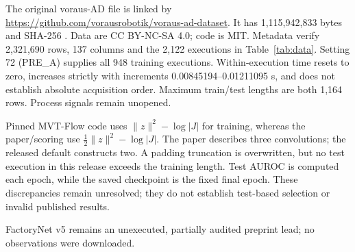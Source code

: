 The original voraus-AD file is linked by \url{https://github.com/vorausrobotik/voraus-ad-dataset}. It has 1,115,942,833 bytes and SHA-256 . Data are CC BY-NC-SA 4.0; code is MIT. Metadata verify 2,321,690 rows, 137 columns and the 2,122 executions in Table~\ref{tab:data}. Setting 72 (PRE\_A) supplies all 948 training executions. Within-execution time resets to zero, increases strictly with increments 0.00845194--0.01211095 s, and does not establish absolute acquisition order. Maximum train/test lengths are both 1,164 rows. Process signals remain unopened.

Pinned MVT-Flow code  uses $\|z\|^2-\log|J|$ for training, whereas the paper/scoring use $\tfrac12\|z\|^2-\log|J|$. The paper describes three convolutions; the released default constructs two. A padding truncation is overwritten, but no test execution in this release exceeds the training length. Test AUROC is computed each epoch, while the saved checkpoint is the fixed final epoch. These discrepancies remain unresolved; they do not establish test-based selection or invalid published results.

FactoryNet v5 remains an unexecuted, partially audited preprint lead; no observations were downloaded.
